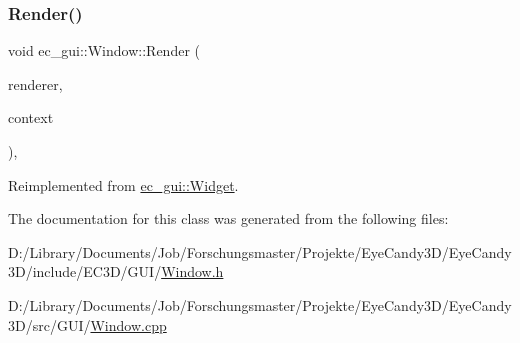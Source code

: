 \subsubsection{\texorpdfstring{Render()}{Render()}}
{\footnotesize\ttfamily void ec\+\_\+gui\+::\+Window\+::\+Render (\begin{DoxyParamCaption}\item[{\mbox{\hyperlink{classec__gui_1_1_g_u_i_renderer}{G\+U\+I\+Renderer}} \&}]{renderer,  }\item[{\mbox{\hyperlink{classec__gui_1_1_g_u_i_rendering_context}{G\+U\+I\+Rendering\+Context}} \&}]{context }\end{DoxyParamCaption})\hspace{0.3cm}{\ttfamily [override]}, {\ttfamily [virtual]}}



Reimplemented from \mbox{\hyperlink{classec__gui_1_1_widget_a5a8b9275293ea433e6ba8fec3e7b5232}{ec\+\_\+gui\+::\+Widget}}.



The documentation for this class was generated from the following files\+:\begin{DoxyCompactItemize}
\item 
D\+:/\+Library/\+Documents/\+Job/\+Forschungsmaster/\+Projekte/\+Eye\+Candy3\+D/\+Eye\+Candy3\+D/include/\+E\+C3\+D/\+G\+U\+I/\mbox{\hyperlink{_g_u_i_2_window_8h}{Window.\+h}}\item 
D\+:/\+Library/\+Documents/\+Job/\+Forschungsmaster/\+Projekte/\+Eye\+Candy3\+D/\+Eye\+Candy3\+D/src/\+G\+U\+I/\mbox{\hyperlink{_g_u_i_2_window_8cpp}{Window.\+cpp}}\end{DoxyCompactItemize}
